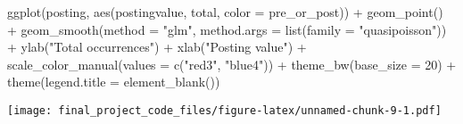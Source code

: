 \documentclass[
]{article}
\newenvironment{Shaded}{\begin{snugshade}}{\end{snugshade}}
\newcommand{\AttributeTok}[1]{\textcolor[rgb]{0.77,0.63,0.00}{#1}}
\newcommand{\DecValTok}[1]{\textcolor[rgb]{0.00,0.00,0.81}{#1}}
\newcommand{\FunctionTok}[1]{\textcolor[rgb]{0.00,0.00,0.00}{#1}}
\newcommand{\NormalTok}[1]{#1}
\newcommand{\SpecialCharTok}[1]{\textcolor[rgb]{0.00,0.00,0.00}{#1}}
\newcommand{\StringTok}[1]{\textcolor[rgb]{0.31,0.60,0.02}{#1}}
\begin{document}
\begin{Shaded}
\begin{Highlighting}[]
\FunctionTok{ggplot}\NormalTok{(posting, }\FunctionTok{aes}\NormalTok{(postingvalue, total, }\AttributeTok{color =}\NormalTok{ pre\_or\_post)) }\SpecialCharTok{+} 
  \FunctionTok{geom\_point}\NormalTok{() }\SpecialCharTok{+} 
  \FunctionTok{geom\_smooth}\NormalTok{(}\AttributeTok{method =} \StringTok{"glm"}\NormalTok{, }\AttributeTok{method.args =} \FunctionTok{list}\NormalTok{(}\AttributeTok{family =} \StringTok{"quasipoisson"}\NormalTok{)) }\SpecialCharTok{+}
  \FunctionTok{ylab}\NormalTok{(}\StringTok{"Total occurrences"}\NormalTok{) }\SpecialCharTok{+}
  \FunctionTok{xlab}\NormalTok{(}\StringTok{"Posting value"}\NormalTok{) }\SpecialCharTok{+}
  \FunctionTok{scale\_color\_manual}\NormalTok{(}\AttributeTok{values =} \FunctionTok{c}\NormalTok{(}\StringTok{"red3"}\NormalTok{, }\StringTok{"blue4"}\NormalTok{)) }\SpecialCharTok{+}
  \FunctionTok{theme\_bw}\NormalTok{(}\AttributeTok{base\_size =} \DecValTok{20}\NormalTok{) }\SpecialCharTok{+} \FunctionTok{theme}\NormalTok{(}\AttributeTok{legend.title =} \FunctionTok{element\_blank}\NormalTok{())}
\end{Highlighting}
\end{Shaded}

\texttt{[image: final\_project\_code\_files/figure-latex/unnamed-chunk-9-1.pdf]}
\end{document}
